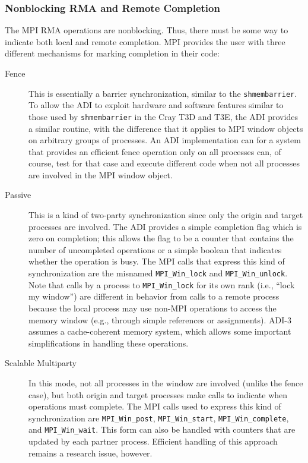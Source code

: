 \documentclass{article}
\def\code#1{\texttt{#1}}
\begin{document}
\subsubsection{Nonblocking RMA and Remote Completion}
The MPI RMA operations are nonblocking.  Thus, there must be some way
to indicate both local and remote completion.  MPI provides the user
with three different mechanisms for marking completion in their code:
\begin{description}
\item[Fence]This is essentially a barrier synchronization, similar to
the \code{shmembarrier}.  To allow the ADI to exploit hardware and
software features similar to those used by \code{shmembarrier} in the
Cray T3D and T3E, the ADI provides a similar routine, with the
difference that it applies to MPI window objects on arbitrary groups
of processes. An ADI implementation can for a system that
provides an efficient fence operation only on all processes can, of
course, test for that case and execute different code when not all
processes are involved in the MPI window object.

\item[Passive]This is a kind of two-party synchronization since only
the origin and target processes are involved.  The ADI provides a
simple completion flag which is zero on completion; this allows the
flag to be a counter that contains the number of uncompleted
operations or a simple boolean that indicates whether the operation is
busy.  The MPI calls that express this kind of synchronization are the
misnamed 
\code{MPI_Win_lock} and \code{MPI_Win_unlock}.  Note that calls by a
process to \code{MPI_Win_lock} for its own rank (i.e., ``lock my
window'') are different in behavior from calls to a remote process
because the local process may use non-MPI operations to access the
memory window (e.g., through simple references or assignments).  ADI-3
assumes a cache-coherent memory system, which allows some important
simplifications in handling these operations.

\item[Scalable Multiparty]In this mode, not all processes in the
window are involved (unlike the fence case), but both origin and
target processes make calls to indicate when operations must complete.
The MPI calls used to express this kind of synchronization are
\code{MPI_Win_post}, \code{MPI_Win_start}, \code{MPI_Win_complete},
and \code{MPI_Win_wait}.
This form can also be handled with counters that are updated by each
partner process.  Efficient handling of this approach remains a
research issue, however.
\end{description}
\end{document}
